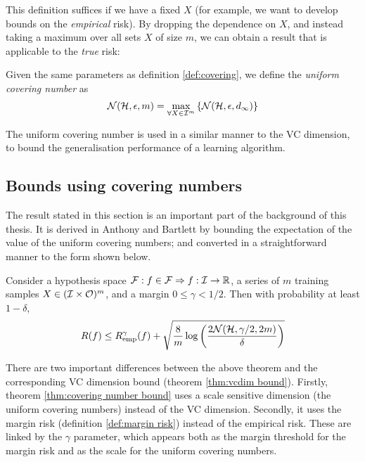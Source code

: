 This definition suffices if we have a fixed $X$ (for example, we want
to develop bounds on the \emph{empirical} risk).  By dropping the
dependence on $X$, and instead taking a maximum over all sets
$X$ of size $m$, we can obtain a result that is applicable to the
\emph{true} risk: 

\begin{definition}
Given the same parameters as definition \ref{def:covering}, we define
the \emph{uniform covering number} as
\begin{equation}
\label{eqn:uniform covering numbers}
\mathcal{N}({\mathcal{H}}, {\epsilon}, {m}) = \max_{\forall X \in \mathcal{I}^m} \left\{
\mathcal{N}({\mathcal{H}}, {\epsilon}, {d_{\infty}}) \right\}
\end{equation}
\end{definition}

The uniform covering number is used in a similar manner to the VC
dimension, to bound the generalisation performance of a learning
algorithm. 

\subsection{Bounds using covering numbers}
\label{sec:covering number bounds}

The result stated in this section is an important part of the
background of this thesis.  It is derived in Anthony and Bartlett
\cite{Anthony98} by bounding the expectation of the value of the
uniform covering numbers; and converted in a straightforward manner to
the form shown below.

\begin{theorem}
\label{thm:covering number bound}
Consider a hypothesis space $\mathcal{F} : f \in \mathcal{F} \Rightarrow f : \mathcal{I}
\rightarrow \mathbb{R}$, a series of $m$ training samples $X \in
(\mathcal{I} \times \mathcal{O})^m$, and a margin $0 \leq \gamma < 1/2$.  Then
with probability at least $1 - \delta$,  
\begin{equation}
R(f) \leq R_{\mathrm{emp}}^{\gamma}(f) + \sqrt{\frac{8}{m} \log \left( \frac{2
\mathcal{N}({\mathcal{H}}, {\gamma/2}, {2m})}{\delta} \right)}
\label{eqn:covering number bound}
\end{equation}
\end{theorem}

There are two important differences between the above theorem and the
corresponding VC dimension bound (theorem \ref{thm:vcdim bound}). 
Firstly, theorem \ref{thm:covering number bound} uses a scale
sensitive dimension (the uniform covering numbers) instead of the VC
dimension.  Secondly, it uses the margin risk (definition
\ref{def:margin risk}) instead of the empirical risk.  These are linked
by the $\gamma$ parameter, which appears both as the margin threshold
for the margin risk and as the scale for the uniform covering numbers.

